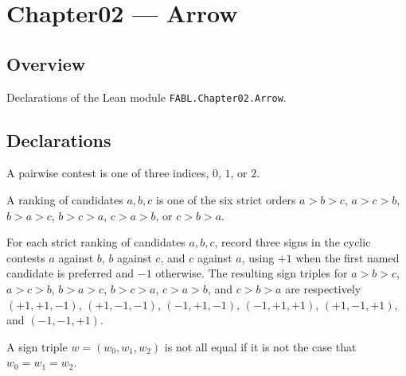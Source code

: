 \chapter{Chapter02 — Arrow}
\section{Overview}

Declarations of the Lean module \texttt{FABL.Chapter02.Arrow}.

\section{Declarations}

\begin{definition}
\label{FABL.PairwiseContest}
\leanok
A pairwise contest is one of three indices, $0$, $1$, or $2$.
\end{definition}

\begin{definition}
\label{FABL.Ranking3}
\leanok
A ranking of candidates $a,b,c$ is one of the six strict orders $a>b>c$, $a>c>b$,
$b>a>c$, $b>c>a$, $c>a>b$, or $c>b>a$.
\end{definition}

\begin{definition}
\label{FABL.rankingPreference}
\leanok
{}
For each strict ranking of candidates $a,b,c$, record three signs in the cyclic contests
$a$ against $b$, $b$ against $c$, and $c$ against $a$, using $+1$ when the first named
candidate is preferred and $-1$ otherwise. The resulting sign triples for $a>b>c$,
$a>c>b$, $b>a>c$, $b>c>a$, $c>a>b$, and $c>b>a$ are respectively $(+1,+1,-1)$,
$(+1,-1,-1)$, $(-1,+1,-1)$, $(-1,+1,+1)$, $(+1,-1,+1)$, and $(-1,-1,+1)$.
\end{definition}

\begin{definition}
\label{FABL.IsNAE3}
\leanok
{}
A sign triple $w=(w_0,w_1,w_2)$ is not all equal if it is not the case that
$w_0=w_1=w_2$.
\end{definition}


